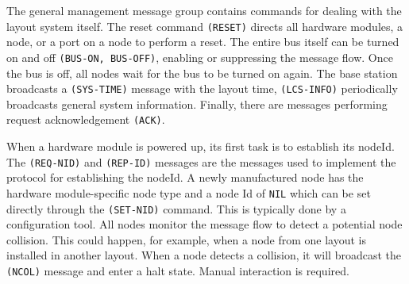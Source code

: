 
The general management message group contains commands for dealing with the layout system itself. The reset command \texttt{(RESET)} directs all hardware modules, a node, or a port on a node to perform a reset. The entire bus itself can be turned on and off \texttt{(BUS-ON, BUS-OFF)}, enabling or suppressing the message flow. Once the bus is off, all nodes wait for the bus to be turned on again. The base station broadcasts a \texttt{(SYS-TIME)} message with the layout time, \texttt{(LCS-INFO)} periodically broadcasts general system information. Finally, there are messages performing request acknowledgement \texttt{(ACK)}.

\begin{table}[ht!]
    \centering 
\end{table}


When a hardware module is powered up, its first task is to establish its nodeId. The \texttt{(REQ-NID)} and \texttt{(REP-ID)} messages are the messages used to implement the protocol for establishing the nodeId. A newly manufactured node has the hardware module-specific node type and a node Id of \texttt{NIL} which can be set directly through the \texttt{(SET-NID)} command. This is typically done by a configuration tool. All nodes monitor the message flow to detect a potential node collision. This could happen, for example, when a node from one layout is installed in another layout. When a node detects a collision, it will broadcast the \texttt{(NCOL)} message and enter a halt state. Manual interaction is required.

